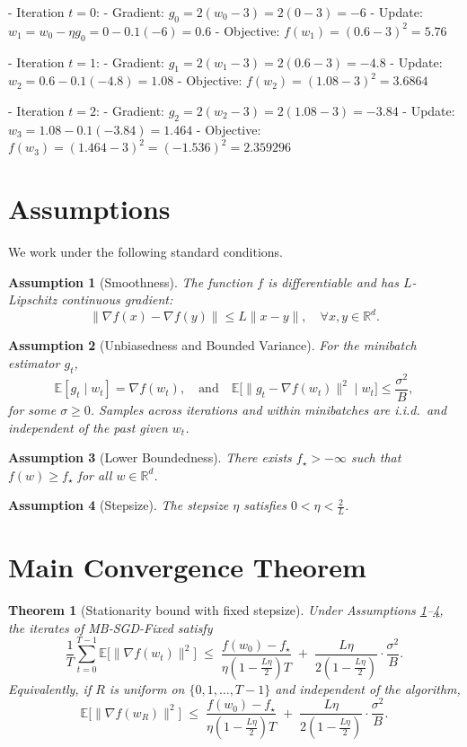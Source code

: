\documentclass[11pt]{article}
\newtheorem{theorem}{Theorem}
\newtheorem{assumption}{Assumption}
\newcommand{\E}{\mathbb{E}}
\newcommand{\R}{\mathbb{R}}
\begin{document}
- Iteration $t=0$:
  - Gradient: $g_0 = 2(w_0-3) = 2(0-3) = -6$
  - Update: $w_1 = w_0 - \eta g_0 = 0 - 0.1(-6) = 0.6$
  - Objective: $f(w_1) = (0.6-3)^2 = 5.76$

- Iteration $t=1$:
  - Gradient: $g_1 = 2(w_1-3) = 2(0.6-3) = -4.8$
  - Update: $w_2 = 0.6 - 0.1(-4.8) = 1.08$
  - Objective: $f(w_2) = (1.08-3)^2 = 3.6864$

- Iteration $t=2$:
  - Gradient: $g_2 = 2(w_2-3) = 2(1.08-3) = -3.84$
  - Update: $w_3 = 1.08 - 0.1(-3.84) = 1.464$
  - Objective: $f(w_3) = (1.464-3)^2 = ( -1.536 )^2 = 2.359296$

\section*{Assumptions}
We work under the following standard conditions.

\begin{assumption}[Smoothness]
\label{assump:smooth}
The function $f$ is differentiable and has $L$-Lipschitz continuous gradient:
\[
\|\nabla f(x) - \nabla f(y)\| \le L \|x-y\|, \quad \forall x,y\in\R^d.
\]
\end{assumption}

\begin{assumption}[Unbiasedness and Bounded Variance]
\label{assump:unbiased-var}
For the minibatch estimator $g_t$,
\[
\E[g_t \mid w_t] = \nabla f(w_t), \quad \text{and}\quad \E\big[\|g_t - \nabla f(w_t)\|^2 \mid w_t\big] \le \frac{\sigma^2}{B},
\]
for some $\sigma\ge 0$. Samples across iterations and within minibatches are i.i.d.\ and independent of the past given $w_t$.
\end{assumption}

\begin{assumption}[Lower Boundedness]
\label{assump:lower}
There exists $f_\star>-\infty$ such that $f(w)\ge f_\star$ for all $w\in\R^d$.
\end{assumption}

\begin{assumption}[Stepsize]
\label{assump:stepsize}
The stepsize $\eta$ satisfies $0<\eta<\frac{2}{L}$.
\end{assumption}

\section*{Main Convergence Theorem}
\begin{theorem}[Stationarity bound with fixed stepsize]
\label{thm:main}
Under Assumptions \ref{assump:smooth}--\ref{assump:stepsize}, the iterates of MB-SGD-Fixed satisfy
\[
\frac{1}{T}\sum_{t=0}^{T-1}\E\big[\|\nabla f(w_t)\|^2\big]
\;\le\;
\frac{f(w_0)-f_\star}{\eta\left(1-\frac{L\eta}{2}\right)T}
\;+\;
\frac{L\eta}{2\left(1-\frac{L\eta}{2}\right)}\cdot \frac{\sigma^2}{B}.
\]
Equivalently, if $R$ is uniform on $\{0,1,\dots,T-1\}$ and independent of the algorithm,
\[
\E\big[\|\nabla f(w_R)\|^2\big]
\;\le\;
\frac{f(w_0)-f_\star}{\eta\left(1-\frac{L\eta}{2}\right)T}
\;+\;
\frac{L\eta}{2\left(1-\frac{L\eta}{2}\right)}\cdot \frac{\sigma^2}{B}.
\]
\end{theorem}
\end{document}
